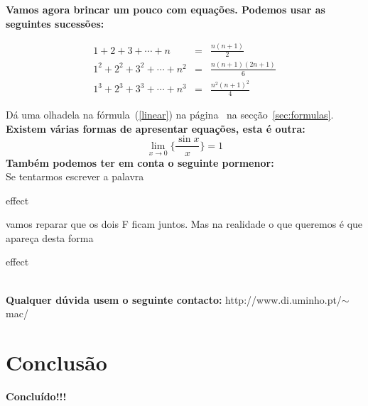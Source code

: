 \documentclass[a4paper,11pt]{article}
\begin{document}
\textbf{Vamos agora brincar um pouco com equações. Podemos usar as seguintes sucessões:}

\begin{eqnarray}
1+2+3+\cdots+n&=&\frac{n(n+1)}{2}\label{linear}\\
1^2+2^2+3^2+\cdots+n^2&=& \frac{n(n+1)(2n+1)}{6}\label{squares}\nonumber\\
1^3+2^3+3^3+\cdots+n^3&=& \frac{n^2(n+1)^2}{4}\label{cubes}
\end{eqnarray}

Dá uma olhadela na fórmula~(\ref{linear}) na página~\pageref{linear} na secção~\ref{sec:formulas}.\\

\textbf{Existem várias formas de apresentar equações, esta é outra:}
\begin{displaymath}
\lim_{x \rightarrow 0}
\Bigg\{\frac{\sin x}{x}\Bigg\}=1
\end{displaymath}
\newline
\newline
\textbf{Também podemos ter em conta o seguinte pormenor:}\\
Se tentarmos escrever a palavra \begin{Huge}effect\end{Huge} vamos reparar que os dois F ficam juntos. Mas na realidade o que queremos é que apareça desta forma \begin{Huge}ef\mbox{}fect\end{Huge}\\
\newline
\textbf{Qualquer dúvida usem o seguinte contacto:} http://www.di.uminho.pt/$\sim$mac/

\newpage

\section{\LARGE Conclusão}
\textbf{Concluído!!!}
\end{document}
